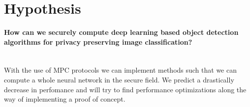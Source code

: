 \section{Hypothesis}
\paragraph{How can we securely compute deep learning based object detection algorithms for privacy preserving image classification?}\mbox{} \\
With the use of MPC protocols we can implement methods such that we can compute a whole neural network in the secure field. We predict a drastically decrease in perfomance and will try to find performance optimizations along the way of implementing a proof of concept.
